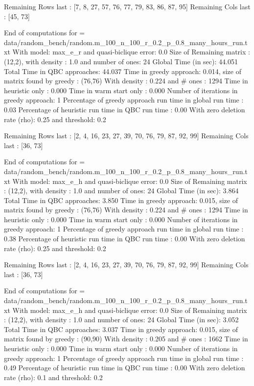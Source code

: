  Remaining Rows last : [7, 8, 27, 57, 76, 77, 79, 83, 86, 87, 95]
 Remaining  Cols  last : [45, 73]
  
    End of computations for = data/random_bench/random.m_100_n_100_r_0.2_p_0.8_many_hours_run.txt 
    With  model: max_e_r and quasi-biclique error: 0.0
    Size of Remaining matrix : (12,2), with  density : 1.0 and number of ones: 24
    Global Time (in sec): 44.051
    Total Time in QBC approaches: 44.037
    Time in greedy approach: 0.014,  size of matrix found by greedy : (76,76) 
    With density : 0.224 and # ones : 1294 
    Time in heuristic only : 0.000 
    Time in warm start only : 0.000
    Number of iterations in greedy approach: 1
    Percentage of greedy approach run time in global run time : 0.03%
    Percentage of heuristic run time in QBC run time : 0.00%
    With zero deletion rate (rho): 0.25 and threshold: 0.2
    
 Remaining Rows last : [2, 4, 16, 23, 27, 39, 70, 76, 79, 87, 92, 99]
 Remaining  Cols  last : [36, 73]
 
 
    End of computations for = data/random_bench/random.m_100_n_100_r_0.2_p_0.8_many_hours_run.txt 
    With  model: max_e_h and quasi-biclique error: 0.0
    Size of Remaining matrix : (12,2), with  density : 1.0 and number of ones: 24
    Global Time (in sec): 3.864
    Total Time in QBC approaches: 3.850
    Time in greedy approach: 0.015,  size of matrix found by greedy : (76,76) 
    With density : 0.224 and # ones : 1294 
    Time in heuristic only : 0.000 
    Time in warm start only : 0.000
    Number of iterations in greedy approach: 1
    Percentage of greedy approach run time in global run time : 0.38%
    Percentage of heuristic run time in QBC run time : 0.00%
    With zero deletion rate (rho): 0.25 and threshold: 0.2
    
 Remaining Rows last : [2, 4, 16, 23, 27, 39, 70, 76, 79, 87, 92, 99]
 Remaining  Cols  last : [36, 73]
  
    End of computations for = data/random_bench/random.m_100_n_100_r_0.2_p_0.8_many_hours_run.txt 
    With  model: max_e_h and quasi-biclique error: 0.0
    Size of Remaining matrix : (12,2), with  density : 1.0 and number of ones: 24
    Global Time (in sec): 3.052
    Total Time in QBC approaches: 3.037
    Time in greedy approach: 0.015,  size of matrix found by greedy : (90,90) 
    With density : 0.205 and # ones : 1662 
    Time in heuristic only : 0.000 
    Time in warm start only : 0.000
    Number of iterations in greedy approach: 1
    Percentage of greedy approach run time in global run time : 0.49%
    Percentage of heuristic run time in QBC run time : 0.00%
    With zero deletion rate (rho): 0.1 and threshold: 0.2
    
